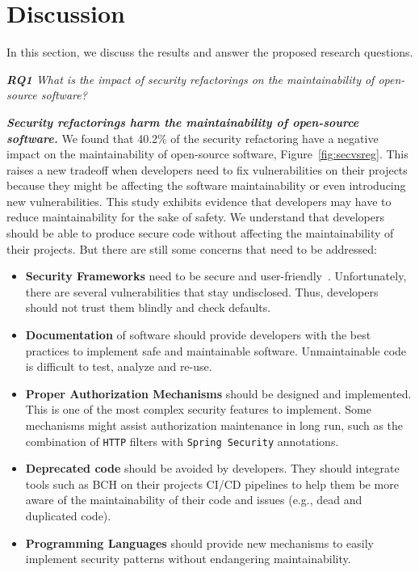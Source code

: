 \documentclass[10pt,conference]{IEEEtran}
\begin{document}
{\section{Discussion}\label{sec:discussion}

In this section, we discuss the results and answer the proposed research questions.

\begin{framed}
\textit{\textbf{RQ1} What is the impact of security refactorings on the maintainability
of open-source software?}
\end{framed}

\textbf{\textit{Security refactorings harm the maintainability of open-source software.}}
%
We found that 40.2\% of the security refactoring have a negative impact on the
maintainability of open-source software, Figure~\ref{fig:secvsreg}. This raises
a new tradeoff when developers need to fix vulnerabilities on their projects
because they might be affecting the software maintainability or even introducing
new vulnerabilities. This study exhibits evidence that developers may have to
reduce maintainability for the sake of safety. We understand that developers
should be able to produce secure code without affecting the maintainability of
their projects. But there are still some concerns that need to be addressed:
\begin{itemize}
	\item \textbf{Security Frameworks} need to be secure and user-friendly~\cite{5287006, 7676144}. Unfortunately,
	there are several vulnerabilities that stay undisclosed. Thus, developers should not
	trust them blindly and check defaults.
	\item \textbf{Documentation} of software should provide developers with the best practices to implement safe and maintainable software. Unmaintainable code is difficult to test, analyze and re-use.
	\item \textbf{Proper Authorization Mechanisms} should be designed and implemented. This is
	one of the most complex security features to implement. Some mechanisms might assist authorization maintenance in long run, such as the combination of \texttt{HTTP} filters with \texttt{Spring Security} annotations.
	\item \textbf{Deprecated code} should be avoided by developers. They should integrate tools such as BCH on their projects CI/CD pipelines to help them be more aware of the maintainability of their code and issues (e.g., dead and duplicated code).
	\item\textbf{Programming Languages} should provide new mechanisms to easily implement security patterns without endangering maintainability.


\end{itemize}}
\end{document}
